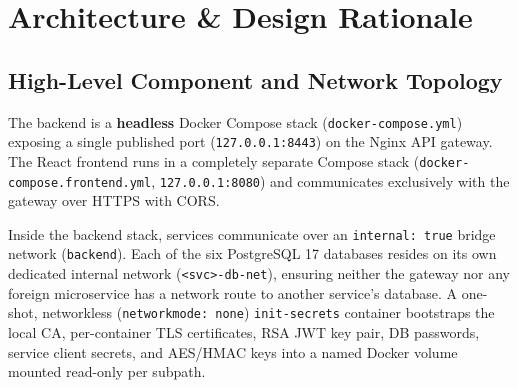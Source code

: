 \documentclass[10.5pt,a4paper]{article}
\DeclareRobustCommand{\code}[1]{\begingroup\def\_{\textunderscore\allowbreak}\texttt{#1}\endgroup}
\begin{document}
\section{Architecture \& Design Rationale}
\label{sec:architecture}

\subsection{High-Level Component and Network Topology}

The backend is a \textbf{headless} Docker Compose stack (\code{docker-compose.yml}) exposing a single published port (\code{127.0.0.1:8443}) on the Nginx API gateway. The React frontend runs in a completely separate Compose stack (\code{docker-compose.frontend.yml}, \code{127.0.0.1:8080}) and communicates exclusively with the gateway over HTTPS with CORS.

Inside the backend stack, services communicate over an \code{internal: true} bridge network (\code{backend}). Each of the six PostgreSQL 17 databases resides on its own dedicated internal network (\code{<svc>-db-net}), ensuring neither the gateway nor any foreign microservice has a network route to another service's database. A one-shot, networkless (\code{network\_mode: none}) \code{init-secrets} container bootstraps the local CA, per-container TLS certificates, RSA JWT key pair, DB passwords, service client secrets, and AES/HMAC keys into a named Docker volume mounted read-only per subpath.
\end{document}

